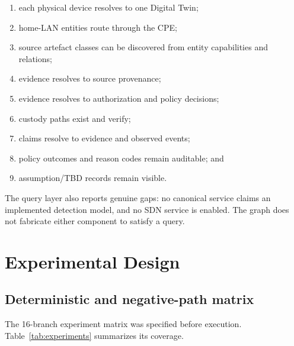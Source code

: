﻿\documentclass[11pt,a4paper]{article}
\begin{document}
\begin{enumerate}
  \item each physical device resolves to one Digital Twin;
  \item home-LAN entities route through the CPE;
  \item source artefact classes can be discovered from entity capabilities and relations;
  \item evidence resolves to source provenance;
  \item evidence resolves to authorization and policy decisions;
  \item custody paths exist and verify;
  \item claims resolve to evidence and observed events;
  \item policy outcomes and reason codes remain auditable; and
  \item assumption/TBD records remain visible.
\end{enumerate}

The query layer also reports genuine gaps: no canonical service claims an implemented detection model, and no SDN service is enabled. The graph does not fabricate either component to satisfy a query.

\section{Experimental Design}

\subsection{Deterministic and negative-path matrix}

The 16-branch experiment matrix was specified before execution. Table~\ref{tab:experiments} summarizes its coverage.
\end{document}
